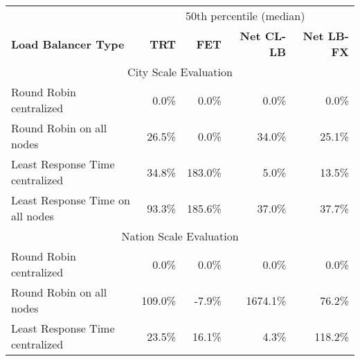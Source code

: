 \begin{table}[]
\begin{tabular}{lrrrr}
\hline
                                 & \multicolumn{4}{c}{50th percentile (median)}                                                                                                          \\
\textbf{Load Balancer Type}      & \multicolumn{1}{r}{\textbf{TRT}} & \multicolumn{1}{r}{\textbf{FET}} & \multicolumn{1}{r}{\textbf{Net CL-LB}} & \multicolumn{1}{r}{\textbf{Net LB-FX}} \\ \hline
\multicolumn{5}{c}{City Scale Evaluation}                                                                                                                                                \\ \hline
Round Robin centralized          & 0.0\%                            & 0.0\%                            & 0.0\%                                  & 0.0\%                                  \\
Round Robin on all nodes         & 26.5\%                           & 0.0\%                            & 34.0\%                                 & 25.1\%                                 \\
Least Response Time centralized  & 34.8\%                           & 183.0\%                          & 5.0\%                                  & 13.5\%                                 \\
Least Response Time on all nodes & 93.3\%                           & 185.6\%                          & 37.0\%                                 & 37.7\%                                 \\ \hline
\multicolumn{5}{c}{Nation Scale Evaluation}                                                                                                                                              \\ \hline
Round Robin centralized          & 0.0\%                            & 0.0\%                            & 0.0\%                                  & 0.0\%                                  \\
Round Robin on all nodes         & 109.0\%                          & -7.9\%                           & 1674.1\%                               & 76.2\%                                 \\
Least Response Time centralized  & 23.5\%                           & 16.1\%                           & 4.3\%                                  & 118.2\%                                \\

\end{tabular}
\end{table}
